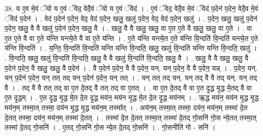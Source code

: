 \documentclass[17pt]{extarticle}
\begin{document}
38. य ए॒व मे॒वं ॅयो य ए॒वं ॅवेद॒ वेदै॒वं ॅयो य ए॒वं ॅवेद॑ । . ए॒वं ॅवेद॒ वेदै॒व मे॒वं ॅवेद॑ प॒देन॑ प॒देन॒ वेदै॒व मे॒वं ॅवेद॑ प॒देन॑ । . वेद॑ प॒देन॑ प॒देन॒ वेद॒ वेद॑ प॒देन॒ खलु॒ खलु॑ प॒देन॒ वेद॒ वेद॑ प॒देन॒ खलु॑ । . प॒देन॒ खलु॒ खलु॑ प॒देन॑ प॒देन॒ खलु॒ वै वै खलु॑ प॒देन॑ प॒देन॒ खलु॒ वै । . खलु॒ वै वै खलु॒ खलु॒ वा ए॒त ए॒ते वै खलु॒ खलु॒ वा ए॒ते । . वा ए॒त ए॒ते वै वा ए॒ते य॑न्ति यन्त्ये॒ते वै वा ए॒ते य॑न्ति । . ए॒ते य॑न्ति यन्त्ये॒त ए॒ते य॑न्ति वि॒न्दति॑ वि॒न्दति॑ यन्त्ये॒त ए॒ते य॑न्ति वि॒न्दति॑ । . य॒न्ति॒ वि॒न्दति॑ वि॒न्दति॑ यन्ति यन्ति वि॒न्दति॒ खलु॒ खलु॑ वि॒न्दति॑ यन्ति यन्ति वि॒न्दति॒ खलु॑ । . वि॒न्दति॒ खलु॒ खलु॑ वि॒न्दति॑ वि॒न्दति॒ खलु॒ वै वै खलु॑ वि॒न्दति॑ वि॒न्दति॒ खलु॒ वै । . खलु॒ वै वै खलु॒ खलु॒ वै प॒देन॑ प॒देन॒ वै खलु॒ खलु॒ वै प॒देन॑ । . वै प॒देन॑ प॒देन॒ वै वै प॒देन॒ यन्. यन् प॒देन॒ वै वै प॒देन॒ यन्न् । . प॒देन॒ यन्. यन् प॒देन॑ प॒देन॒ यन् तत् तद् यन् प॒देन॑ प॒देन॒ यन् तत् । . यन् तत् तद् यन्. यन् तद् वै वै तद् यन्. यन् तद् वै । . तद् वै वै तत् तद् वा ए॒त दे॒तद् वै तत् तद् वा ए॒तत् । . वा ए॒त दे॒तद् वै वा ए॒त दृ॒द्ध मृ॒द्ध मे॒तद् वै वा ए॒त दृ॒द्धम् । . ए॒त दृ॒द्ध मृ॒द्ध मे॒त दे॒त दृ॒द्ध मय॑न॒ मय॑न मृ॒द्ध मे॒त दे॒त दृ॒द्ध मय॑नम् । . ऋ॒द्ध मय॑न॒ मय॑न मृ॒द्ध मृ॒द्ध मय॑न॒म् तस्मा॒त् तस्मा॒ दय॑न मृ॒द्ध मृ॒द्ध मय॑न॒म् तस्मा᳚त् । . अय॑न॒म् तस्मा॒त् तस्मा॒ दय॑न॒ मय॑न॒म् तस्मा॑ दे॒त दे॒तत् तस्मा॒ दय॑न॒ मय॑न॒म् तस्मा॑ दे॒तत् । . तस्मा॑ दे॒त दे॒तत् तस्मा॒त् तस्मा॑ दे॒तद् गो॒सनि॑ गो॒स न्ये॒तत् तस्मा॒त् तस्मा॑ दे॒तद् गो॒सनि॑ । . ए॒तद् गो॒सनि॑ गो॒स न्ये॒त दे॒तद् गो॒सनि॑ । . गो॒सनीति॑ गो - सनि॑ । \newline
\pagebreak
{}
\end{document}
